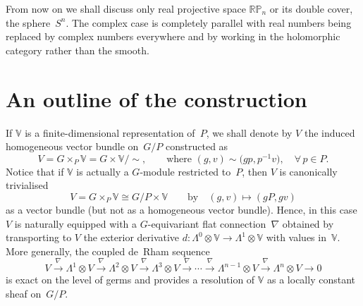 \documentclass[pdftex]{sigma}
\begin{document}
From now on we shall discuss only real projective space ${\mathbb{RP}}_n$ or
its double cover, the sphere~$S^n$. The complex case is completely parallel
with real numbers being replaced by complex numbers everywhere and by working
in the holomorphic category rather than the smooth.

\section{An outline of the construction}\label{outline}

If ${\mathbb{V}}$ is a f\/inite-dimensional representation of~$P$, we shall
denote by $V$ the induced homogeneous vector bundle on~$G/P$ constructed as
\[V=G\times_P{\mathbb{V}}=G\times{\mathbb{V}}/\sim,
\qquad\mbox{where }(g,v)\sim\big(g p,p^{-1}v\big),\quad \forall\, p\in P.\]
Notice that if ${\mathbb{V}}$ is actually a $G$-module restricted to~$P$, then
$V$ is canonically trivialised
\begin{equation}\label{twist}
V=G\times_P{\mathbb{V}}\cong G/P\times{\mathbb{V}}\qquad\mbox{by}\quad
(g,v)\mapsto(gP,g v)\end{equation}
as a vector bundle (but not as a homogeneous vector bundle). Hence, in this
case $V$ is naturally equipped with a $G$-equivariant f\/lat connection~$\nabla$
obtained by transporting to $V$ the exterior derivative
$d:\Lambda^0\otimes{\mathbb{V}}\to\Lambda^1\otimes{\mathbb{V}}$ with
values in~${\mathbb{V}}$. More generally, the coupled de~Rham sequence
\begin{equation}\label{coupled}V\xrightarrow{\,\nabla\,}\Lambda^1\otimes V
\xrightarrow{\,\nabla\,}\Lambda^2\otimes V
\xrightarrow{\,\nabla\,}\Lambda^3\otimes V \xrightarrow{\,\nabla\,}\cdots
\xrightarrow{\,\nabla\,}\Lambda^{n-1}\otimes V
\xrightarrow{\,\nabla\,}\Lambda^n\otimes V\to 0\end{equation} is exact on the
level of germs and provides a resolution of ${\mathbb{V}}$ as a locally
constant sheaf on~$G/P$.
\end{document}
